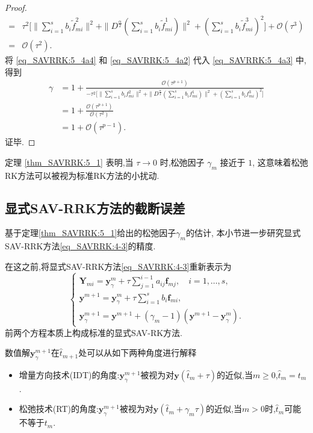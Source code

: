 \begin{proof}
\begin{align}
	=&\tau^2\Big[\|\sum\limits_{i=1}^{s}b_i\tilde{f}_{mi}^2\|^2+ \|D^\frac{\alpha}{2}(\sum\limits_{i=1}^{s}b_i\tilde{f}_{mi}^1)\|^2+(\sum\limits_{i=1}^{s}b_i\tilde{f}_{mi}^3)^2\Big]+\mathcal{O}(\tau^3)\nonumber\\
	=&\mathcal{O}(\tau^2).
\end{align}
将 \eqref{eq_SAVRRK:5_4a4} 和 \eqref{eq_SAVRRK:5_4a2} 代入 \eqref{eq_SAVRRK:5_4a3} 中,得到
\begin{align}\label{eq_SAVRRK:5_4a5}
	\gamma&=1+\frac{\mathcal{O}(\tau^{p+1})}{-\tau^2\Big[\|\sum\limits_{i=1}^{s}b_if_{mi}^2\|^2+ \|D^\frac{\alpha}{2}(\sum\limits_{i=1}^{s}b_if_{mi}^1)\|^2+(\sum\limits_{i=1}^{s}b_if_{mi}^3)^2\Big]}\nonumber\\
	&=1+\frac{\mathcal{O}(\tau^{p+1})}{\mathcal{O}(\tau^2)}\nonumber\\
	&=1+\mathcal{O}(\tau^{p-1}).
\end{align}
证毕.
\end{proof}

\begin{remark}\label{rk_SAVRRK:5_1}
定理 \ref{thm_SAVRRK:5_1} 表明,当 $\tau\rightarrow 0$ 时,松弛因子 $\gamma_m$ 接近于 $1$,
这意味着松弛RK方法可以被视为标准RK方法的小扰动.
\end{remark}

\subsection{显式SAV-RRK方法的截断误差}
基于定理\ref{thm_SAVRRK:5_1}给出的松弛因子$\gamma_m$的估计, 本小节进一步研究显式SAV-RRK方法\eqref{eq_SAVRRK:4-3}的精度.

在这之前,将显式SAV-RRK方法\eqref{eq_SAVRRK:4-3}重新表示为
\begin{equation}
\left\{\begin{array}{l}
\bm{Y}_{m i}=\bm{y}_\gamma^m+\tau \sum\limits_{j=1}^{i-1} a_{i j} \bm{f}_{m j}, \quad i=1, \ldots, s, \\
\bm{y}^{m+1}=\bm{y}_\gamma^m+\tau \sum\limits_{i=1}^s b_i \bm{f}_{m i},\\
\bm{y}_\gamma^{m+1}=\bm{y}^{m+1}+\left(\gamma_m-1\right)\left(\bm{y}^{m+1}-\bm{y}_\gamma^m\right) .
\end{array}\right.\label{eq_SAVRRK:4-321}
\end{equation}
前两个方程本质上构成标准的显式SAV-RK方法.

数值解$\bm{y}_\gamma^{m+1}$在$\hat{t}_{m+1}$处可以从如下两种角度进行解释\cite{ketchesonRelaxationRungeKutta2019}%
\begin{itemize}
\item 增量方向技术(IDT)的角度:$\bm{y}_\gamma^{m+1}$被视为对$\bm{y}\left(\hat{t}_m+\tau\right)$的近似,当$m \geq 0$,$\hat{t}_m=t_m$.
\item 松弛技术(RT)的角度:$\bm{y}_\gamma^{m+1}$被视为对$\bm{y}\left(\hat{t}_m+\gamma_m \tau\right)$的近似,当$m>0$时,$\hat{t}_m$可能不等于$t_m$.
\end{itemize}

